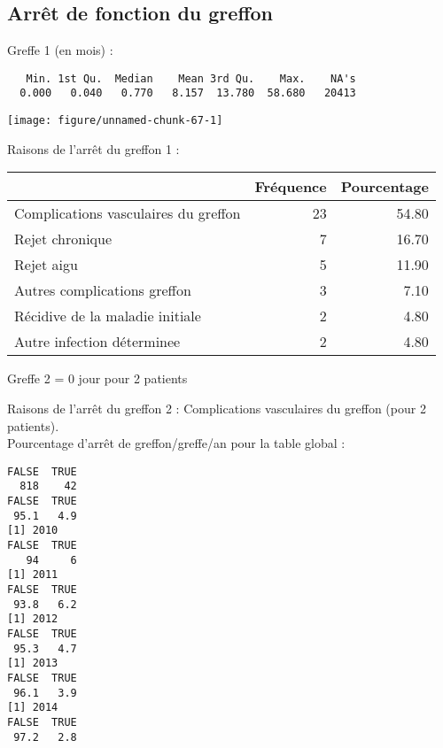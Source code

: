 \documentclass[11pt,a4paper]{article}\usepackage[]{graphicx}\usepackage[]{color}
\makeatletter
\def\maxwidth{ %
  \ifdim\Gin@nat@width>\linewidth
    \linewidth
  \else
    \Gin@nat@width
  \fi
}
\newenvironment{kframe}{%
 \def\at@end@of@kframe{}%
 \ifinner\ifhmode%
  \def\at@end@of@kframe{\end{minipage}}%
  \begin{minipage}{\columnwidth}%
 \fi\fi%
 \def\FrameCommand##1{\hskip\@totalleftmargin \hskip-\fboxsep
 \colorbox{shadecolor}{##1}\hskip-\fboxsep
     \hskip-\linewidth \hskip-\@totalleftmargin \hskip\columnwidth}%
 \MakeFramed {\advance\hsize-\width
   \@totalleftmargin\z@ \linewidth\hsize
   \@setminipage}}%
 {\par\unskip\endMakeFramed%
 \at@end@of@kframe}
\newenvironment{knitrout}{}{} %
\makeatother
\begin{document}
  \subsection{Arrêt de fonction du greffon}

Greffe 1 (en mois) :
  
\begin{knitrout}
\color{fgcolor}\begin{kframe}
\begin{verbatim}
   Min. 1st Qu.  Median    Mean 3rd Qu.    Max.    NA's 
  0.000   0.040   0.770   8.157  13.780  58.680   20413 
\end{verbatim}
\end{kframe}
\texttt{[image: figure/unnamed-chunk-67-1]} 

\end{knitrout}

Raisons de l'arrêt du greffon 1 :
\begin{table}[H]
\centering
\begin{tabular}{lrr}
  \hline
 & Fréquence & Pourcentage \\ 
  \hline
Complications vasculaires du greffon &  23 & 54.80 \\ 
  Rejet chronique &   7 & 16.70 \\ 
  Rejet aigu &   5 & 11.90 \\ 
  Autres complications greffon &   3 & 7.10 \\ 
  Récidive de la maladie initiale &   2 & 4.80 \\ 
  Autre infection déterminee &   2 & 4.80 \\ 
   \hline
\end{tabular}
\end{table}


Greffe 2 = 0 jour pour 2 patients

Raisons de l'arrêt du greffon 2 : Complications vasculaires du greffon  (pour 2 patients).
~\\

Pourcentage d'arrêt de greffon/greffe/an pour la table global :

\begin{knitrout}
\color{fgcolor}\begin{kframe}
\begin{verbatim}
FALSE  TRUE 
  818    42 
FALSE  TRUE 
 95.1   4.9 
[1] 2010
FALSE  TRUE 
   94     6 
[1] 2011
FALSE  TRUE 
 93.8   6.2 
[1] 2012
FALSE  TRUE 
 95.3   4.7 
[1] 2013
FALSE  TRUE 
 96.1   3.9 
[1] 2014
FALSE  TRUE 
 97.2   2.8 
\end{verbatim}
\end{kframe}
\end{knitrout}
\end{document}
